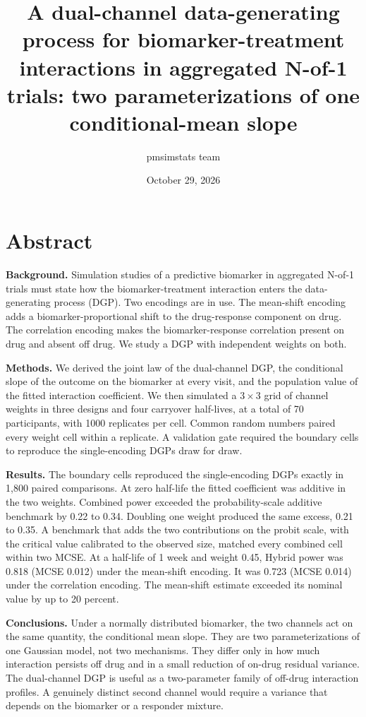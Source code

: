 \documentclass[
  11pt,
]{article}
\title{A dual-channel data-generating process for biomarker-treatment interactions in aggregated N-of-1 trials: two parameterizations of one conditional-mean slope}
\author{pmsimstats team}
\date{October 29, 2026}
\begin{document}
\maketitle

{
\setcounter{tocdepth}{2}
\tableofcontents
}
\section*{Abstract}\label{abstract}

\textbf{Background.} Simulation studies of a predictive biomarker in
aggregated N-of-1 trials must state how the biomarker-treatment
interaction enters the data-generating process (DGP). Two encodings
are in use. The mean-shift encoding adds a biomarker-proportional
shift to the drug-response component on drug. The correlation
encoding makes the biomarker-response correlation present on drug and
absent off drug. We study a DGP with independent weights on both.

\textbf{Methods.} We derived the joint law of the dual-channel DGP, the
conditional slope of the outcome on the biomarker at every visit, and
the population value of the fitted interaction coefficient. We then
simulated a \(3 \times 3\) grid of channel weights in three designs and
four carryover half-lives, at a total of 70 participants, with 1000
replicates per cell. Common random numbers paired every weight cell
within a replicate. A validation gate required the boundary cells to
reproduce the single-encoding DGPs draw for draw.

\textbf{Results.} The boundary cells reproduced the single-encoding DGPs exactly in 1,800 paired comparisons. At zero half-life the fitted coefficient was additive in the two weights. Combined power exceeded the probability-scale additive benchmark by 0.22 to 0.34. Doubling one weight produced the same excess, 0.21 to 0.35. A benchmark that adds the two contributions on the probit scale, with the critical value calibrated to the observed size, matched every combined cell within two MCSE. At a half-life of 1 week and weight 0.45, Hybrid power was 0.818 (MCSE 0.012) under the mean-shift encoding. It was 0.723 (MCSE 0.014) under the correlation encoding. The mean-shift estimate exceeded its nominal value by up to 20 percent.

\textbf{Conclusions.} Under a normally distributed biomarker, the two
channels act on the same quantity, the conditional mean slope. They
are two parameterizations of one Gaussian model, not two mechanisms.
They differ only in how much interaction persists off drug and in a
small reduction of on-drug residual variance. The dual-channel DGP is
useful as a two-parameter family of off-drug interaction profiles.
A genuinely distinct second channel would require a variance that
depends on the biomarker or a responder mixture.
\end{document}
